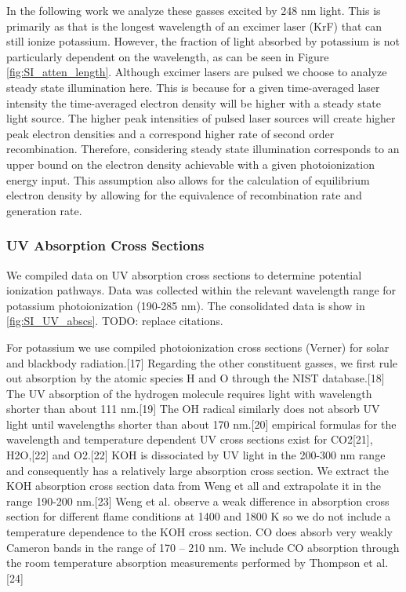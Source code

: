 In the following work we analyze these gasses excited by 248 nm light. This is primarily as that is the longest wavelength of an excimer laser (KrF) that can still ionize potassium. However, the fraction of light absorbed by potassium is not particularly dependent on the wavelength, as can be seen in Figure \ref{fig:SI_atten_length}. Although excimer lasers are pulsed we choose to analyze steady state illumination here. This is because for a given time-averaged laser intensity the time-averaged electron density will be higher with a steady state light source. The higher peak intensities of pulsed laser sources will create higher peak electron densities and a correspond higher rate of second order recombination. Therefore, considering steady state illumination corresponds to an upper bound on the electron density achievable with a given photoionization energy input. This assumption also allows for the calculation of equilibrium electron density by allowing for the equivalence of recombination rate and generation rate.

\subsubsection{UV Absorption Cross Sections}

We compiled data on UV absorption cross sections to determine potential ionization pathways. Data was collected within the relevant wavelength range for potassium photoionization (190-285 nm). The consolidated data is show in \ref{fig:SI_UV_abscs}. TODO: replace citations. 

For potassium we use compiled photoionization cross sections (Verner) for solar and blackbody radiation.{[}17{]} Regarding the other constituent gasses, we first rule out absorption by the atomic species H and O through the NIST database.{[}18{]} The UV absorption of the hydrogen molecule requires light with wavelength shorter than about 111 nm.{[}19{]} The OH radical similarly does not absorb UV light until wavelengths shorter than about 170 nm.{[}20{]} empirical formulas for the wavelength and temperature dependent UV cross sections exist for CO2{[}21{]}, H2O,{[}22{]} and O2.{[}22{]} KOH is dissociated by UV light in the 200-300 nm range and consequently has a relatively large absorption cross section. We extract the KOH absorption cross section data from Weng et all and extrapolate it in the range 190-200 nm.{[}23{]} Weng et al. observe a weak difference in absorption cross section for different flame conditions at 1400 and 1800 K so we do not include a temperature dependence to the KOH cross section. CO does absorb very weakly Cameron bands in the range of 170 -- 210 nm. We include CO absorption through the room temperature absorption measurements performed by Thompson et al.{[}24{]}


